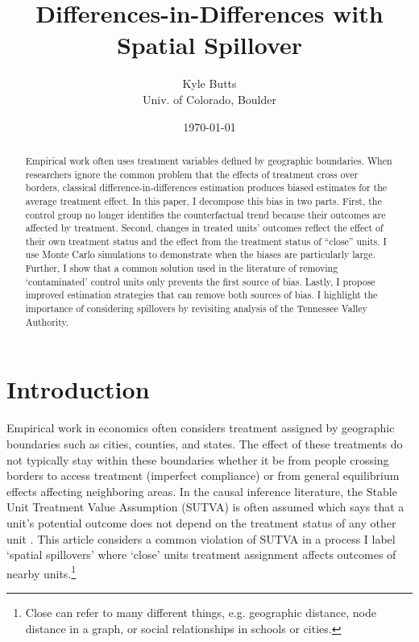 \documentclass[11pt]{article}
\title{\color{navyblue} Differences-in-Differences with Spatial Spillover}
\author{\normalsize Kyle Butts\\{\footnotesize Univ. of Colorado, Boulder}}
\date{\footnotesize\today}
\begin{document}
\begin{titlepage}
    \maketitle
    
    \begin{abstract}
        Empirical work often uses treatment variables defined by geographic boundaries. When researchers ignore the common problem that the effects of treatment cross over borders, classical difference-in-differences estimation produces biased estimates for the average treatment effect. In this paper, I decompose this bias in two parts. First, the control group no longer identifies the counterfactual trend because their outcomes are affected by treatment. Second, changes in treated units' outcomes reflect the effect of their own treatment status and the effect from the treatment status of ``close'' units. I use Monte Carlo simulations to demonstrate when the biases are particularly large. Further, I show that a common solution used in the literature of removing `contaminated' control units only prevents the first source of bias. Lastly, I propose improved estimation strategies that can remove both sources of bias. I highlight the importance of considering spillovers by revisiting analysis of the Tennessee Valley Authority.
    \end{abstract}
\end{titlepage}

\section{Introduction}

Empirical work in economics often considers treatment assigned by geographic boundaries such as cities, counties, and states. The effect of these treatments do not typically stay within these boundaries whether it be from people crossing borders to access treatment (imperfect compliance) or from general equilibrium effects affecting neighboring areas. In the causal inference literature, the Stable Unit Treatment Value Assumption (SUTVA) is often assumed which says that a unit's potential outcome does not depend on the treatment status of any other unit \citep{Rubin_1980}. This article considers a common violation of SUTVA in a process I label `spatial spillovers' where `close' units treatment assignment affects outcomes of nearby units.\footnote{Close can refer to many different things, e.g. geographic distance, node distance in a graph, or social relationships in schools or cities.} 
\end{document}
